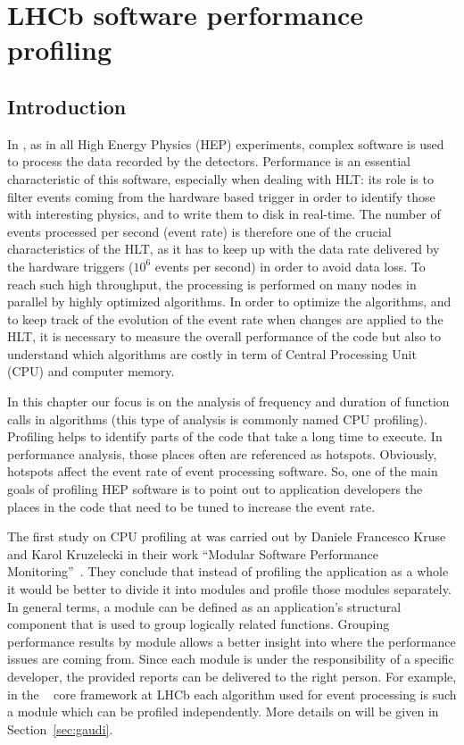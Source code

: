 \chapter{LHCb software performance profiling}
\section{Introduction}

In \lhcb, as in all High Energy Physics (HEP) experiments, complex software is
used to process the data recorded by the detectors. Performance is an essential
characteristic of this software, especially when dealing with HLT: its role is
to filter events coming from the hardware based trigger in order to identify
those with interesting physics, and to write them to disk in real-time. The
number of events processed per second (event rate) is therefore one of the
crucial characteristics of the HLT, as it has to keep up with the data rate
delivered by the hardware triggers ($10^6$ events per second) in order to avoid
data loss. To reach such high throughput, the processing is performed on many
nodes in parallel by highly optimized algorithms. In order to optimize the
algorithms, and to keep track of the evolution of the event rate when changes
are applied to the HLT, it is necessary to measure the overall performance of
the code but also to understand which algorithms are costly in term of Central
Processing Unit (CPU) and computer memory.

In this chapter our focus is on the analysis of frequency and duration of
function calls in algorithms (this type of analysis is commonly named CPU
profiling). Profiling helps to identify parts of the code that take a long time
to execute. In performance analysis, those places often are referenced as
hotspots. Obviously,  hotspots affect the event rate of event processing
software. So, one of the main goals of profiling HEP software is to point out
to application developers the places in the code that need to be tuned to
increase the event rate.

The first study on CPU profiling at \lhcb was carried out by Daniele Francesco
Kruse and Karol Kruzelecki in their work ``Modular Software Performance
Monitoring''~\cite{modular}. They conclude that instead of profiling the
application as a whole it would be better to divide it into modules and profile
those modules separately. In general terms, a module can be defined as an
application’s structural component that is used to group logically related
functions.  Grouping performance results by module allows a better insight into
where the performance issues are coming from. Since each module is under the
responsibility of a specific developer, the provided reports can be delivered
to the right person. For example, in the \gaudi~\cite{Barrand:2001ny} core
framework at LHCb each algorithm used for event processing is such a module
which can be profiled independently. More details on \gaudi will be given in
Section~\ref{sec:gaudi}.

